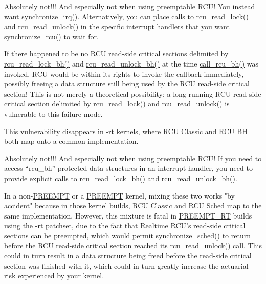 	Absolutely not!!!
	And especially not when using preemptable RCU!
	You instead want \url{synchronize_irq()}.
	Alternatively, you can place calls to \url{rcu_read_lock()}
	and \url{rcu_read_unlock()} in the specific interrupt handlers that
	you want \url{synchronize_rcu()} to wait for.


	If there happened to be no RCU read-side critical
	sections delimited by \url{rcu_read_lock_bh()} and
	\url{rcu_read_unlock_bh()} at the time \url{call_rcu_bh()}
	was invoked, RCU would be within its rights to invoke the callback
	immediately, possibly freeing a data structure still being used by
	the RCU read-side critical section!
	This is not merely a theoretical possibility: a long-running RCU
	read-side critical section delimited by \url{rcu_read_lock()}
	and \url{rcu_read_unlock()} is vulnerable to this failure mode.

	This vulnerability disappears in -rt kernels, where
	RCU Classic and RCU BH both map onto a common implementation.


	Absolutely not!!!
	And especially not when using preemptable RCU!
	If you need to access ``rcu\_bh''-protected data structures
	in an interrupt handler, you need to provide explicit calls to
	\url{rcu_read_lock_bh()} and \url{rcu_read_unlock_bh()}.


	In a non-\url{PREEMPT} or a \url{PREEMPT} kernel, mixing these
	two works "by accident" because in those kernel builds, RCU Classic
	and RCU Sched map to the same implementation.
	However, this mixture is fatal in \url{PREEMPT_RT} builds using the -rt
	patchset, due to the fact that Realtime RCU's read-side critical
	sections can be preempted, which would permit
	\url{synchronize_sched()} to return before the
	RCU read-side critical section reached its \url{rcu_read_unlock()}
	call.
	This could in turn result in a data structure being freed before the
	read-side critical section was finished with it,
	which could in turn greatly increase the actuarial risk experienced
	by your kernel.

